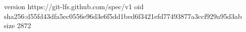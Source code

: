 version https://git-lfs.github.com/spec/v1
oid sha256:d55fd43dfa5ec0556e96d3e6f5dd1bed6f3421efd77493877a3ccf929a95d3ab
size 2872
